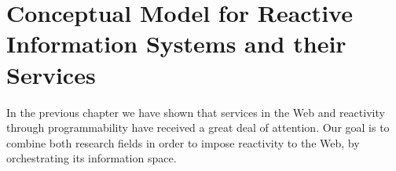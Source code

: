 
\chapter{Conceptual Model for Reactive Information Systems and their Services}

%


In the previous chapter we have shown that services in the Web and reactivity through programmability have received a great deal of attention.
Our goal is to combine both research fields in order to impose reactivity to the Web, by orchestrating its information space. 

